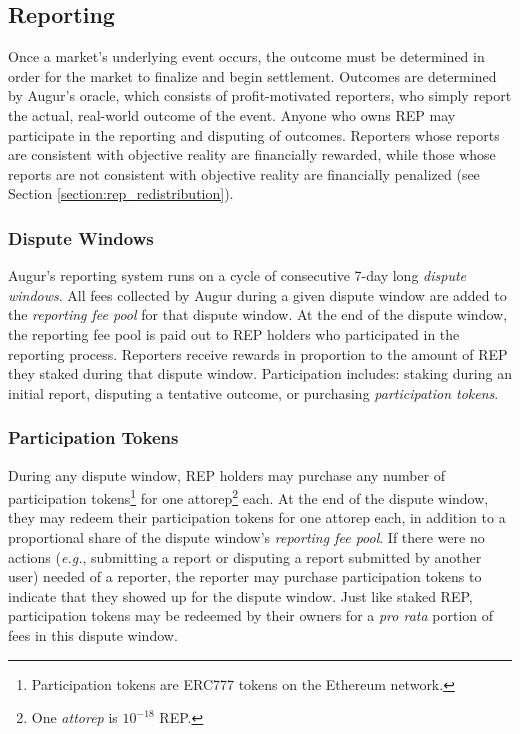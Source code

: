 \documentclass[floatfix,reprint,nofootinbib,amsmath,amssymb,epsfig,pre,floats,letterpaper,groupedaffiliation]{revtex4-1}
\theoremstyle{definition}
\theoremstyle{definition}
\begin{document}
\subsection{Reporting}\label{section:reporting}

Once a market's underlying event occurs, the outcome must be determined in order for the market to finalize and begin settlement.  Outcomes are determined by Augur's oracle, which consists of profit-motivated reporters, who simply report the actual, real-world outcome of the event.  Anyone who owns REP may participate in the reporting and disputing of outcomes.  Reporters whose reports are consistent with objective reality are financially rewarded, while those whose reports are not consistent with objective reality are financially penalized (see Section \ref{section:rep_redistribution}).

\subsubsection{Dispute Windows}

Augur's reporting system runs on a cycle of consecutive 7-day long \textit{dispute windows}.  All fees collected by Augur during a given dispute window are added to the \textit{reporting fee pool} for that dispute window.  At the end of the dispute window, the reporting fee pool is paid out to REP holders who participated in the reporting process.  Reporters receive rewards in proportion to the amount of REP they staked during that dispute window.  Participation includes: staking during an initial report, disputing a tentative outcome, or purchasing \textit{participation tokens}.

\subsubsection{Participation Tokens}

During any dispute window, REP holders may purchase any number of participation tokens\footnote{Participation tokens are ERC777 tokens on the Ethereum network.} for one attorep\footnote{One \textit{attorep} is $10^{-18}$ REP.} each.  At the end of the dispute window, they may redeem their participation tokens for one attorep each, in addition to a proportional share of the dispute window's \textit{reporting fee pool}.  If there were no actions (\textit{e.g.}, submitting a report or disputing a report submitted by another user) needed of a reporter, the reporter may purchase participation tokens to indicate that they showed up for the dispute window.  Just like staked REP, participation tokens may be redeemed by their owners for a \textit{pro rata} portion of fees in this dispute window.
\end{document}
